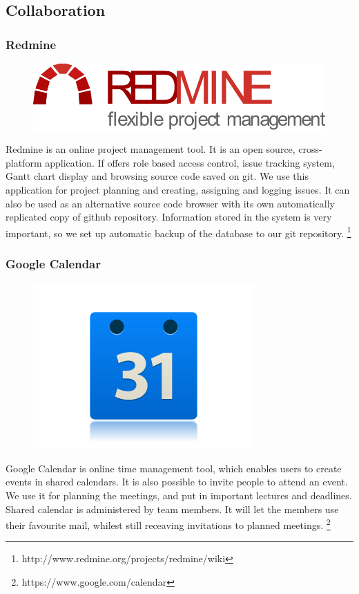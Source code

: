 \subsection{Collaboration}

\subsubsection{Redmine}

\begin{figure}
\vspace{-30pt}
\centering
\includegraphics[width = .30\textwidth]{image/redmine-logo.pdf}
\end{figure}

Redmine is an online project management tool. It is an open source, cross-platform application. If offers role based access control, issue tracking system, Gantt chart display and browsing source code saved on git. We use this application for project planning and creating, assigning and logging issues. It can also be used as an alternative source code browser with its own automatically replicated copy of github repository. Information stored in the system is very important, so we set up automatic backup of the database to our git repository.
\footnote{http://www.redmine.org/projects/redmine/wiki}

\subsubsection{Google Calendar}

\begin{figure}
\vspace{-30pt}
\centering
\includegraphics[width = .20\textwidth]{image/calendar-logo.png}
\end{figure}

Google Calendar is online time management tool, which enables users to create events in shared calendars. It is also possible to invite people to attend an event. We use it for planning the meetings, and put in important lectures and deadlines. Shared calendar is administered by team members. It will let the members use their favourite mail, whilest still receaving invitations to planned meetings.
\footnote{https://www.google.com/calendar}

